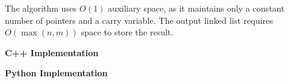 The algorithm uses $O(1)$ auxiliary space, as it maintains only a constant
number of pointers and a carry variable.
The output linked list requires $O(\max(n, m))$ space to store the result.


\bigskip
\noindent\textbf{C++ Implementation}



\bigskip
\noindent\textbf{Python Implementation}



\ProblemDivider

